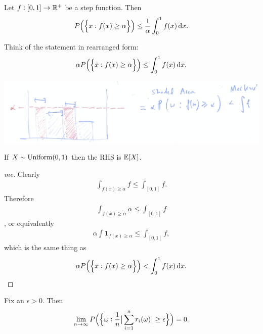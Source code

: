 \begin{lemma}
  Let $f: [0, 1] \to \mathbb{R}^+$ be a step function. Then
  \begin{align*}
    P\Big(\Big\{x: f(x) \geq \alpha\Big\}\Big) \leq \frac{1}{\alpha}\int_0^1 f(x) \dx.
  \end{align*}
\end{lemma}




\begin{intuition}
  Think of the statement in rearranged form:
  \begin{align*}
    \alpha P\Big(\Big\{x: f(x) \geq \alpha\Big\}\Big) \leq \int_0^1 f(x) \dx.
  \end{align*}



  \includegraphics[width=400pt]{img/analysis--real-analysis--measure-theory--weak-law-of-large-numbers-c9c2.png}

  If $X \sim \text{Uniform}(0, 1)$ then the RHS is ${\mathbb E}[X]$.

\end{intuition}


\begin{proof}
  [me]

  Clearly
  \begin{align*}
    \int_{f(x) \geq \alpha} f \leq \int_{[0, 1]} f.
  \end{align*}
  Therefore
  \begin{align*}
    \int_{f(x) \geq \alpha} \alpha \leq \int_{[0, 1]} f
  \end{align*},
  or equivalently
\begin{align*}
  \alpha \int \textbf{1}_{f(x) \geq \alpha} \leq \int_{[0, 1]} f,
\end{align*}
which is the same thing as
  \begin{align*}
    \alpha P\Big(\Big\{x: f(x) \geq \alpha\Big\}\Big) < \int_0^1 f(x) \dx.
  \end{align*}
\end{proof}

\begin{theorem}
  Fix an $\epsilon > 0$. Then
  \begin{align*}
    \lim_{n \to \infty}P\Big(\Big\{\om: \frac{1}{n}\big|\sum_{i=1}^n r_i(\om)\big| \geq \epsilon\Big\}\Big) = 0.
  \end{align*}
\end{theorem}

